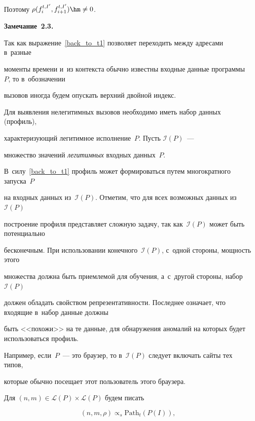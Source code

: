 Поэтому $\rho(f^{t,I'}_{i},f^{t,I'}_{i+1})\hm\neq 0$.





\smallskip



\noindent

\textbf{Замечание~2.3.}\

Так как выражение~\eqref{back_to_t1} позволяет переходить между адресами в~разные

 моменты времени и~из контекста обычно известны входные данные программы~$P$, то в~обозначении

  вызовов иногда будем опускать верхний двойной индекс. 





\smallskip



Для выявления нелегитимных вызовов необходимо иметь набор данных (профиль), 

характеризующий легитимное исполнение~$P$. Пусть $\mathcal{I}(P)$~--- 

множество значений \textit{легитимных} входных данных~$P$. 

В~силу~\eqref{back_to_t1} профиль может формироваться путем многократного запуска~$P$ 

на входных данных из~$\mathcal{I}(P)$. Отметим, что для всех возможных данных из~$\mathcal{I}(P)$ 

построение профиля представляет сложную задачу, так как~$\mathcal{I}(P)$ может быть потенциально 

бесконечным. При использовании конечного~$\mathcal{I}(P)$, с~одной стороны, мощ\-ность этого 

множества должна быть приемлемой для обучения, а~с~другой стороны, набор~$\mathcal{I}(P)$ 

должен обладать свойством репрезентативности. Последнее означает, что входящие в~набор данные должны 

быть <<похожи>> на те данные, для обнаружения аномалий на которых будет использоваться профиль. 

Например, если~$P$~--- это браузер, то в~$\mathcal{I}(P)$ следует включать сайты тех типов, 

которые обычно посещает этот пользователь этого браузера. 



Для $(n,m)\in \mathcal{L}(P)\times \mathcal{L}(P)$ будем писать 

\begin{equation}

\label{pair_in_path}

(n,m,\rho)\propto_{s} \mathrm{Path}_t(P(I)),

\end{equation}

